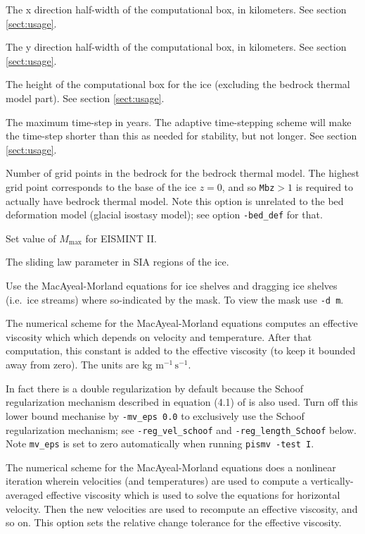 \documentclass[12pt,final]{amsart}
\renewcommand{\t}[1]{\texttt{#1}}
\begin{document}
  The x direction half-width of the computational box, in kilometers.  See section \ref{sect:usage}.

  The y direction half-width of the computational box, in kilometers.  See section \ref{sect:usage}.

  The height of the computational box for the ice (excluding the bedrock thermal model part).  See section \ref{sect:usage}.

  The maximum time-step in years.  The adaptive time-stepping scheme will make the time-step shorter than this as needed for stability, but not longer.  See section \ref{sect:usage}.

  Number of grid points in the bedrock for the bedrock thermal model.  The highest grid point corresponds to the base of the ice $z=0$, and so \t{Mbz}$>1$ is required to actually have bedrock thermal model.  Note this option is unrelated to the bed deformation model (glacial isostasy model); see option \verb|-bed_def| for that.

  Set value of $M_{\text{max}}$ for EISMINT II.

  The sliding law parameter in SIA regions of the ice.

  Use the MacAyeal-Morland equations  \cite{MacAyeal} for ice shelves and dragging ice shelves (i.e.~ice streams) where so-indicated by the mask.  To view the mask use \verb|-d m|.

  The numerical scheme for the MacAyeal-Morland equations computes an effective viscosity which which depends on velocity and temperature.  After that computation, this constant is added to the effective viscosity (to keep it bounded away from zero).  The units are kg $\text{m}^{-1}\,\text{s}^{-1}$. 

In fact there is a double regularization by default because the Schoof regularization mechanism described in equation (4.1) of \cite{SchoofStream} is also used.  Turn off this lower bound mechanise by \verb|-mv_eps 0.0| to exclusively use the Schoof regularization mechanism; see \verb|-reg_vel_schoof| and \verb|-reg_length_Schoof| below.  Note \verb|mv_eps| is set to zero automatically when running \verb|pismv -test I|.

  The numerical scheme for the MacAyeal-Morland equations does a nonlinear iteration wherein velocities (and temperatures) are used to compute a vertically-averaged effective viscosity which is used to solve the equations for horizontal velocity.  Then the new velocities are used to recompute an effective viscosity, and so on.  This option sets the relative change tolerance for the effective viscosity.
\end{document}
